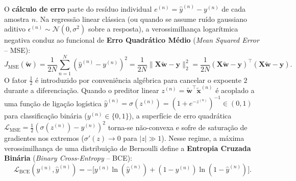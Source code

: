 ﻿\documentclass[runningheads]{llncs}
\begin{document}
O \textbf{c\'{a}lculo de erro} parte do res\'{i}duo individual $e^{(n)} = \hat{y}^{(n)} - y^{(n)}$ de cada amostra $n$. Na regress\~{a}o linear cl\'{a}ssica (ou quando se assume ru\'{i}do gaussiano aditivo $\epsilon^{(n)} \sim \mathcal{N}(0, \sigma^2)$ sobre a resposta), a verossimilhan\c{c}a logar\'{i}tmica negativa conduz ao funcional de \textbf{Erro Quadr\'{a}tico M\'{e}dio} (\textit{Mean Squared Error} -- MSE):
\begin{equation}
    J_{\text{MSE}}(\tilde{\mathbf{w}}) = \frac{1}{2N} \sum_{n=1}^{N} \left(\hat{y}^{(n)} - y^{(n)}\right)^2 = \frac{1}{2N} \|\mathbf{X}\tilde{\mathbf{w}} - \mathbf{y}\|_2^2 = \frac{1}{2N} (\mathbf{X}\tilde{\mathbf{w}} - \mathbf{y})^\top (\mathbf{X}\tilde{\mathbf{w}} - \mathbf{y}).
    \label{eq:mse_matrix}
\end{equation}
O fator $\frac{1}{2}$ \'{e} introduzido por conveni\^{e}ncia alg\'{e}brica para cancelar o expoente $2$ durante a diferencia\c{c}\~{a}o. Quando o preditor linear $z^{(n)} = \tilde{\mathbf{w}}^\top \tilde{\mathbf{x}}^{(n)}$ \'{e} acoplado a uma fun\c{c}\~{a}o de liga\c{c}\~{a}o log\'{i}stica $\hat{y}^{(n)} = \sigma(z^{(n)}) = (1 + e^{-z^{(n)}})^{-1} \in (0, 1)$ para classifica\c{c}\~{a}o bin\'{a}ria ($y^{(n)} \in \{0, 1\}$), a superf\'{i}cie de erro quadr\'{a}tica $\mathcal{L}_{\text{MSE}} = \frac{1}{2}(\sigma(z^{(n)}) - y^{(n)})^2$ torna-se n\~{a}o-convexa e sofre de satura\c{c}\~{a}o de gradientes nos extremos ($\sigma'(z) \to 0$ para $|z| \gg 1$). Nesse regime, a máxima verossimilhan\c{c}a de uma distribui\c{c}\~{a}o de Bernoulli define a \textbf{Entropia Cruzada Bin\'{a}ria} (\textit{Binary Cross-Entropy} -- BCE):
\begin{equation}
    \mathcal{L}_{\text{BCE}}(y^{(n)}, \hat{y}^{(n)}) = -\Big[ y^{(n)} \ln(\hat{y}^{(n)}) + (1 - y^{(n)}) \ln(1 - \hat{y}^{(n)}) \Big].
    \label{eq:bce_loss}
\end{equation}
\end{document}
